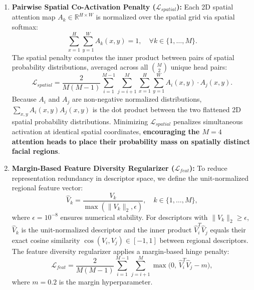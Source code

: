 \documentclass[runningheads]{llncs}
\begin{document}
\begin{enumerate}
    \item \textbf{Pairwise Spatial Co-Activation Penalty ($\mathcal{L}_{spatial}$):} Each 2D spatial attention map $A_k \in \mathbb{R}^{H \times W}$ is normalized over the spatial grid via spatial softmax:
    \begin{equation}
        \sum_{x=1}^{H} \sum_{y=1}^{W} A_k(x,y) = 1, \quad \forall k \in \{1, \dots, M\}.
    \end{equation}
    The spatial penalty computes the inner product between pairs of spatial probability distributions, averaged across all $\binom{M}{2}$ unique head pairs:
    \begin{equation}
        \mathcal{L}_{spatial} = \frac{2}{M(M-1)} \sum_{i=1}^{M-1} \sum_{j=i+1}^{M} \sum_{x=1}^{H} \sum_{y=1}^{W} A_i(x,y) \cdot A_j(x,y).
    \end{equation}
    Because $A_i$ and $A_j$ are non-negative normalized distributions, $\sum_{x,y} A_i(x,y) A_j(x,y)$ is the dot product between the two flattened 2D spatial probability distributions. Minimizing $\mathcal{L}_{spatial}$ penalizes simultaneous activation at identical spatial coordinates, \textbf{encouraging the $M=4$ attention heads to place their probability mass on spatially distinct facial regions}.

    \item \textbf{Margin-Based Feature Diversity Regularizer ($\mathcal{L}_{feat}$):} To reduce representation redundancy in descriptor space, we define the unit-normalized regional feature vector:
    \begin{equation}
        \hat{V}_k = \frac{V_k}{\max(\|V_k\|_2, \epsilon)}, \quad k \in \{1, \dots, M\},
    \end{equation}
    where $\epsilon = 10^{-8}$ ensures numerical stability. For descriptors with $\|V_k\|_2 \ge \epsilon$, $\hat{V}_k$ is the unit-normalized descriptor and the inner product $\hat{V}_i^T \hat{V}_j$ equals their exact cosine similarity $\cos(V_i, V_j) \in [-1, 1]$ between regional descriptors. The feature diversity regularizer applies a margin-based hinge penalty:
    \begin{equation}
        \mathcal{L}_{feat} = \frac{2}{M(M-1)} \sum_{i=1}^{M-1} \sum_{j=i+1}^{M} \max\big(0,\, \hat{V}_i^T \hat{V}_j - m\big),
    \end{equation}
    where $m = 0.2$ is the margin hyperparameter.
\end{enumerate}
\end{document}
